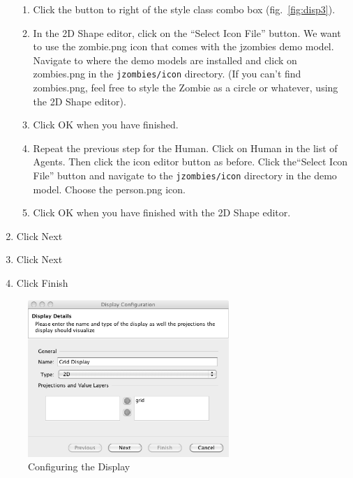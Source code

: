 \documentclass[11pt]{amsart}
\begin{document}
\begin{enumerate}
\begin{enumerate}
\item Click the button to right of the style class combo box (fig.~\ref{fig:disp3}).
\item In the 2D Shape editor, click on the ``Select Icon File'' button. We want to use the zombie.png icon that comes with the jzombies demo model. Navigate to where the demo models are installed and click on zombies.png in the \texttt{jzombies/icon} directory. (If you can't find zombies.png, feel free to style the Zombie as a circle or whatever, using the 2D Shape editor).
\item Click OK when you have finished.
\item Repeat the previous step for the Human. Click on Human in the list of Agents. Then click the icon editor button as before. Click the``Select Icon File'' button and navigate to the \texttt{jzombies/icon} directory in the demo model. Choose the person.png icon.
\item Click OK when you have finished with the 2D Shape editor.
\end{enumerate}

\item Click Next
\item Click Next
\item Click Finish
\end{enumerate}
\vspace{.2in}

\begin{figure}[h]
\begin{center}
\vspace{.2in}
\centerline {
\includegraphics[width=3in]{figs/display1.png}
}
\caption{Configuring the Display}
\label{fig:disp1}
\end{center}
\end{figure}
\end{document}
